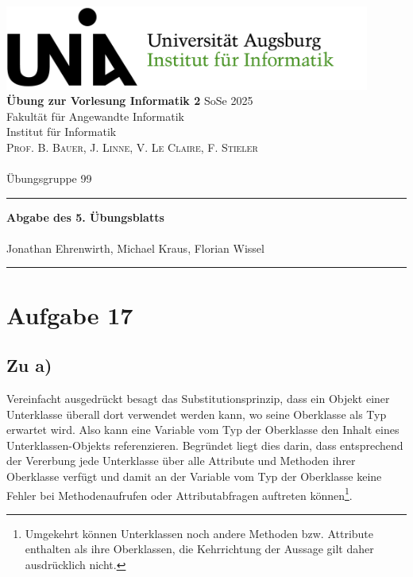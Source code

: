 \documentclass[paper=a4, %
         fontsize=10pt,  %
         oneside,        %
         headsepline,    %
         notitlepage     %
]{scrartcl}              %
\newcommand{\ownline}{\vspace{.7em}\hrule\vspace{.7em}}
\newcommand{\aufgabe}[1]{\section*{Aufgabe #1}}
\begin{document}
\includegraphics[width=0.90\textwidth]{images/logo.png} \\
\textbf{Übung zur Vorlesung Informatik 2} \hfill{SoSe 2025} \\  
Fakultät für Angewandte Informatik \\
Institut für Informatik \\
\textsc{Prof. B. Bauer, J. Linne, V. Le Claire, F. Stieler} \\
\mbox{} \\
{\large Übungsgruppe 99} %
\ownline
\begin{center}
	{\LARGE \textbf{Abgabe des 5. Übungsblatts}} \\ %
	\mbox{} \\
	{\large Jonathan Ehrenwirth, Michael Kraus, Florian Wissel} \\ %
\end{center}
\ownline


\newcommand{\teilaufgabe}[1]{\medskip\subsection*{Zu #1)}\medskip}

\aufgabe{17}

\teilaufgabe{a}

Vereinfacht ausgedrückt besagt das Substitutionsprinzip, dass ein Objekt einer Unterklasse überall dort verwendet werden kann, wo seine Oberklasse als Typ erwartet wird. Also kann eine Variable vom Typ der Oberklasse den Inhalt eines Unterklassen-Objekts referenzieren. Begründet liegt dies darin, dass entsprechend der Vererbung jede Unterklasse über alle Attribute und Methoden ihrer Oberklasse verfügt und damit an der Variable vom Typ der Oberklasse keine Fehler bei Methodenaufrufen oder Attributabfragen auftreten können\footnote{Umgekehrt können Unterklassen noch andere Methoden bzw. Attribute enthalten als ihre Oberklassen, die Kehrrichtung der Aussage gilt daher ausdrücklich nicht.}. 
\end{document}
